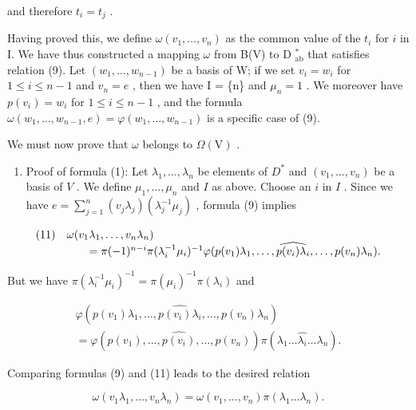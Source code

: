 and therefore \(t_i = t_j\) .

Having proved this, we define \(\omega(v_1, \ldots, v_n)\) as the common value of the \(t_i\) for \(i\) in I. We have thus constructed a mapping \(\omega\) from B(V) to D \(_{\text{ab}}^*\) that satisfies relation (9). Let \((w_1, \ldots, w_{n-1})\) be a basis of W; if we set \(v_i = w_i\) for \(1 \leqslant i \leqslant n-1\) and \(v_n = e\) , then we have I = \{n\} and \(\mu_n = 1\) . We moreover have \(p(v_i) = w_i\) for \(1 \leqslant i \leqslant n-1\) , and the formula \(\omega(w_1, \ldots, w_{n-1}, e) = \varphi(w_1, \ldots, w_{n-1})\) is a specific case of (9).

We must now prove that \(\omega\) belongs to \(\Omega (\mathrm{V})\) .

\begin{enumerate}
\def\labelenumi{\Alph{enumi})}
\setcounter{enumi}{2}
\tightlist
\item
  Proof of formula (1): Let \(\lambda_1, \ldots, \lambda_n\) be elements of \(D^*\) and \((v_1, \ldots, v_n)\) be a basis of \(V\) . We define \(\mu_1, \ldots, \mu_n\) and \(I\) as above. Choose an \(i\) in \(I\) . Since we have \(e = \sum_{j=1}^{n} (v_j \lambda_j)(\lambda_j^{-1} \mu_j)\) , formula (9) implies
\end{enumerate}

\[
\begin{array}{l l} (1 1) & \omega (v _ {1} \lambda_ {1}, \ldots , v _ {n} \lambda_ {n}) \\ & \qquad = \pi (- 1) ^ {n - i} \pi (\lambda_ {i} ^ {- 1} \mu_ {i}) ^ {- 1} \varphi (p (v _ {1}) \lambda_ {1}, \ldots , \widehat {p (v _ {i}) \lambda_ {i}}, \ldots , p (v _ {n}) \lambda_ {n}). \end{array}
\]

But we have \(\pi (\lambda_i^{-1}\mu_i)^{-1} = \pi (\mu_i)^{-1}\pi (\lambda_i)\) and

\[
\begin{array}{c} \varphi (p (v _ {1}) \lambda_ {1}, \ldots , \widehat {p (v _ {i}) \lambda_ {i}}, \ldots , p (v _ {n}) \lambda_ {n}) \\ = \varphi (p (v _ {1}), \ldots , \widehat {p (v _ {i})}, \ldots , p (v _ {n})) \pi (\lambda_ {1} \ldots \widehat {\lambda_ {i}} \ldots \lambda_ {n}). \end{array}
\]

Comparing formulas (9) and (11) leads to the desired relation

\[
\omega (v _ {1} \lambda_ {1}, \ldots , v _ {n} \lambda_ {n}) = \omega (v _ {1}, \ldots , v _ {n}) \pi (\lambda_ {1} \ldots \lambda_ {n}).
\]

